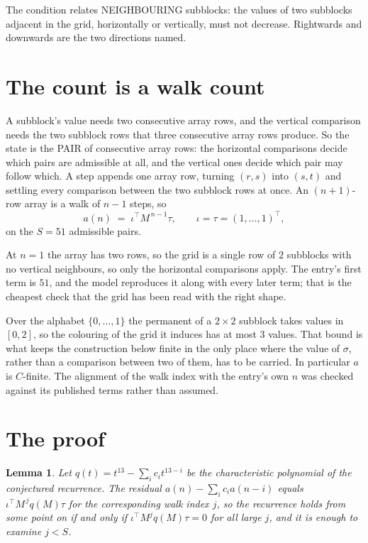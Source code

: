 \documentclass[11pt,a4paper]{article}
\theoremstyle{plain}
\newtheorem{lemma}[theorem]{Lemma}
\theoremstyle{definition}
\begin{document}
The condition relates NEIGHBOURING subblocks: the values of two subblocks adjacent in the grid,
horizontally or vertically, must not decrease. Rightwards and downwards are the two directions named.

\section{The count is a walk count}

A subblock's value needs two consecutive array rows, and the vertical
comparison needs the two subblock rows that three consecutive array rows produce. So the state
is the PAIR of consecutive array rows: the horizontal comparisons decide which pairs are
admissible at all, and the vertical ones decide which pair may follow which. A step appends one
array row, turning $(r,s)$ into $(s,t)$ and settling every comparison between the two subblock
rows at once. An $(n+1)$-row array is a walk of $n-1$ steps, so
\[
a(n)\;=\;\iota^{\!\top}M^{\,n-1}\tau,\qquad\iota=\tau=(1,\dots,1)^{\!\top},
\]
on the $S=51$ admissible pairs.

At $n=1$ the array has two rows, so the grid is a single row of $2$
subblocks with no vertical neighbours, so only the horizontal comparisons apply. The
entry's first term is $51$, and the model reproduces it along with every later term; that
is the cheapest check that the grid has been read with the right shape.

Over the alphabet $\{0,\dots,1\}$ the permanent of a $2\times2$ subblock takes values in
$[0,2]$, so the colouring of the grid it induces has at most $3$ values.
That bound is what keeps the construction below finite in the only place where the value of
$\sigma$, rather than a comparison between two of them, has to be carried.
In particular $a$ is $C$-finite. The alignment of the walk index with the entry's own $n$ was
checked against its published terms rather than assumed.

\section{The proof}

\begin{lemma}\label{lem:crit}
Let $q(t)=t^{13}-\sum_i c_it^{13-i}$ be the characteristic polynomial of the
conjectured recurrence. The residual $a(n)-\sum_ic_ia(n-i)$ equals
$\iota^{\!\top}M^{\,j}q(M)\tau$ for the corresponding walk index $j$, so the recurrence
holds from some point on if and only if $\iota^{\!\top}M^{j}q(M)\tau=0$ for all large $j$,
and it is enough to examine $j<S$.
\end{lemma}
\end{document}
